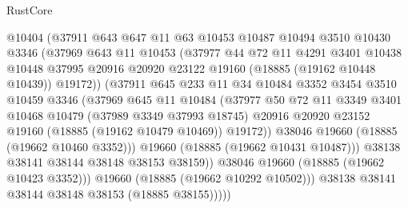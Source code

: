 \begin{lexlean}{RustCore}
\begin{coremodule}
                    @10404
                    (@37911
                      @643
                      @647
                      @11
                      @63
                      @10453
                      @10487
                      @10494
                      @3510
                      @10430
                      @3346
                      (@37969
                        @643
                        @11
                        @10453
                        (@37977
                          @44
                          @72
                          @11
                          @4291
                          @3401
                          @10438
                          @10448
                          @37995
                          @20916
                          @20920
                          @23122
                          @19160
                          (@18885 (@19162 @10448 @10439))
                          @19172))
                      (@37911
                        @645
                        @233
                        @11
                        @34
                        @10484
                        @3352
                        @3454
                        @3510
                        @10459
                        @3346
                        (@37969
                          @645
                          @11
                          @10484
                          (@37977
                            @50
                            @72
                            @11
                            @3349
                            @3401
                            @10468
                            @10479
                            (@37989 @3349 @37993 @18745)
                            @20916
                            @20920
                            @23152
                            @19160
                            (@18885 (@19162 @10479 @10469))
                            @19172))
                        @38046
                        @19660
                        (@18885 (@19662 @10460 @3352)))
                      @19660
                      (@18885 (@19662 @10431 @10487)))
                    @38138
                    @38141
                    @38144
                    @38148
                    @38153
                    @38159))
                @38046
                @19660
                (@18885 (@19662 @10423 @3352)))
              @19660
              (@18885 (@19662 @10292 @10502)))
            @38138
            @38141
            @38144
            @38148
            @38153
            (@18885 @38155)))))

\end{coremodule}
\end{lexlean}
